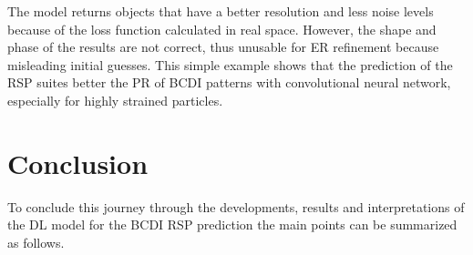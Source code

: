 The model returns objects that have a better resolution and less noise levels because of the loss function calculated in 
real space. However, the shape and phase of the results are not correct, thus unusable for ER refinement because misleading 
initial guesses. 
This simple example shows that the prediction of the RSP suites better the PR of BCDI patterns with convolutional 
neural network, especially for highly strained particles. 

\section{Conclusion}

To conclude this journey through the developments, results and interpretations of the DL model for the BCDI RSP prediction 
the main points can be summarized as follows.
